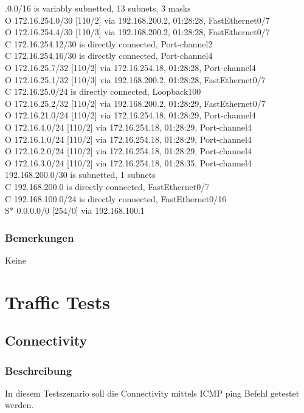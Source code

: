 \documentclass[a4,12pt]{scrartcl}
\begin{document}
.0.0/16 is variably subnetted, 13 subnets, 3 masks\\
O       172.16.254.0/30 [110/2] via 192.168.200.2, 01:28:28, FastEthernet0/7\\
O       172.16.254.4/30 [110/3] via 192.168.200.2, 01:28:28, FastEthernet0/7\\
C       172.16.254.12/30 is directly connected, Port-channel2\\
C       172.16.254.16/30 is directly connected, Port-channel4\\
O       172.16.25.7/32 [110/2] via 172.16.254.18, 01:28:28, Port-channel4\\
O       172.16.25.1/32 [110/3] via 192.168.200.2, 01:28:28, FastEthernet0/7\\
C       172.16.25.0/24 is directly connected, Loopback100\\
O       172.16.25.2/32 [110/2] via 192.168.200.2, 01:28:29, FastEthernet0/7\\
O       172.16.21.0/24 [110/2] via 172.16.254.18, 01:28:29, Port-channel4\\
O       172.16.4.0/24 [110/2] via 172.16.254.18, 01:28:29, Port-channel4\\
O       172.16.1.0/24 [110/2] via 172.16.254.18, 01:28:29, Port-channel4\\
O       172.16.2.0/24 [110/2] via 172.16.254.18, 01:28:29, Port-channel4\\
O       172.16.3.0/24 [110/2] via 172.16.254.18, 01:28:35, Port-channel4\\
     192.168.200.0/30 is subnetted, 1 subnets\\
C       192.168.200.0 is directly connected, FastEthernet0/7\\
C    192.168.100.0/24 is directly connected, FastEthernet0/16\\
S*   0.0.0.0/0 [254/0] via 192.168.100.1
\subsubsection{Bemerkungen}
Keine

\newpage
\section{Traffic Tests}
\subsection{Connectivity}
\subsubsection{Beschreibung}
In diesem Testszenario soll die Connectivity mittels ICMP ping Befehl getestet werden.
\end{document}
